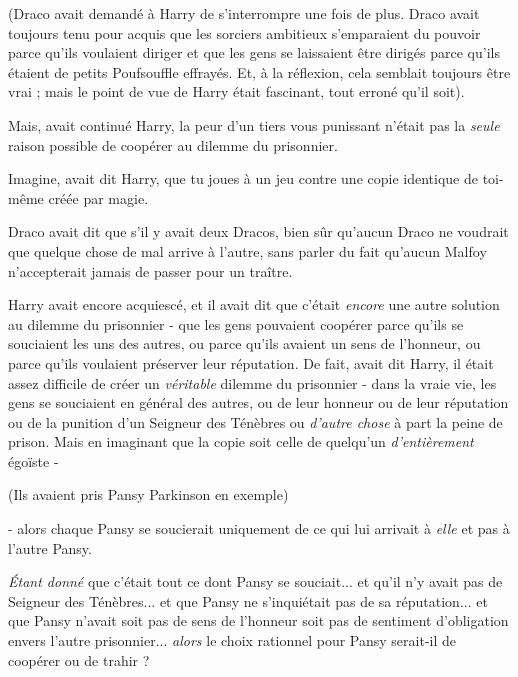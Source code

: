 (Draco avait demandé à Harry de s'interrompre une fois de plus. Draco avait toujours tenu pour acquis que les sorciers ambitieux s'emparaient du pouvoir parce qu'ils voulaient diriger et que les gens se laissaient être dirigés parce qu'ils étaient de petits Poufsouffle effrayés. Et, à la réflexion, cela semblait toujours être vrai ; mais le point de vue de Harry était fascinant, tout erroné qu'il soit).

Mais, avait continué Harry, la peur d'un tiers vous punissant n'était pas la \emph{seule}  raison possible de coopérer au dilemme du prisonnier.

Imagine, avait dit Harry, que tu joues à un jeu contre une copie identique de toi-même créée par magie.

Draco avait dit que s'il y avait deux Dracos, bien sûr qu'aucun Draco ne voudrait que quelque chose de mal arrive à l'autre, sans parler du fait qu'aucun Malfoy n'accepterait jamais de passer pour un traître.

Harry avait encore acquiescé, et il avait dit que c'était \emph{encore}  une autre solution au dilemme du prisonnier - que les gens pouvaient coopérer parce qu'ils se souciaient les uns des autres, ou parce qu'ils avaient un sens de l'honneur, ou parce qu'ils voulaient préserver leur réputation. De fait, avait dit Harry, il était assez difficile de créer un \emph{véritable}  dilemme du prisonnier - dans la vraie vie, les gens se souciaient en général des autres, ou de leur honneur ou de leur réputation ou de la punition d'un Seigneur des Ténèbres ou \emph{d'autre chose}  à part la peine de prison. Mais en imaginant que la copie soit celle de quelqu'un \emph{d'entièrement}  égoïste -

(Ils avaient pris Pansy Parkinson en exemple)

- alors chaque Pansy se soucierait uniquement de ce qui lui arrivait à \emph{elle } et pas à l'autre Pansy.

\emph{Étant donné}  que c'était tout ce dont Pansy se souciait... et qu'il n'y avait pas de Seigneur des Ténèbres... et que Pansy ne s'inquiétait pas de sa réputation... et que Pansy n'avait soit pas de sens de l'honneur soit pas de sentiment d'obligation envers l'autre prisonnier... \emph{alors}  le choix rationnel pour Pansy serait-il de coopérer ou de trahir ?

